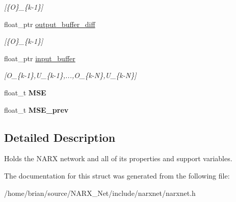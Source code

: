 \begin{DoxyCompactItemize}
\begin{DoxyCompactList}\small\item\em \mbox{[}\{O\}\-\_\-\{k-\/1\}\mbox{]} \end{DoxyCompactList}\item 
\hypertarget{struct_n_a_r_x_net_a298733c8544ca7cc7e889a9e87275b60}{float\-\_\-ptr \hyperlink{struct_n_a_r_x_net_a298733c8544ca7cc7e889a9e87275b60}{output\-\_\-buffer\-\_\-diff}}\label{struct_n_a_r_x_net_a298733c8544ca7cc7e889a9e87275b60}

\begin{DoxyCompactList}\small\item\em \mbox{[}\{O\}\-\_\-\{k-\/1\}\mbox{]} \end{DoxyCompactList}\item 
\hypertarget{struct_n_a_r_x_net_a718c4737d0db5e6e6bbc71b2a63804f4}{float\-\_\-ptr \hyperlink{struct_n_a_r_x_net_a718c4737d0db5e6e6bbc71b2a63804f4}{input\-\_\-buffer}}\label{struct_n_a_r_x_net_a718c4737d0db5e6e6bbc71b2a63804f4}

\begin{DoxyCompactList}\small\item\em \mbox{[}O\-\_\-\{k-\/1\},U\-\_\-\{k-\/1\},...,O\-\_\-\{k-\/\-N\},U\-\_\-\{k-\/\-N\}\mbox{]} \end{DoxyCompactList}\item 
\hypertarget{struct_n_a_r_x_net_af10a02ca889963a7f7f5c37155389ded}{float\-\_\-t {\bfseries M\-S\-E}}\label{struct_n_a_r_x_net_af10a02ca889963a7f7f5c37155389ded}

\item 
\hypertarget{struct_n_a_r_x_net_a40c18d483091fa9e08f29a83a2f3441f}{float\-\_\-t {\bfseries M\-S\-E\-\_\-prev}}\label{struct_n_a_r_x_net_a40c18d483091fa9e08f29a83a2f3441f}

\end{DoxyCompactItemize}


\subsection{Detailed Description}
Holds the N\-A\-R\-X network and all of its properties and support variables. 

The documentation for this struct was generated from the following file\-:\begin{DoxyCompactItemize}
\item 
/home/brian/source/\-N\-A\-R\-X\-\_\-\-Net/include/narxnet/narxnet.\-h\end{DoxyCompactItemize}
